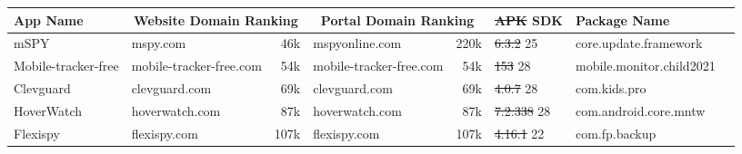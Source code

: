 \documentclass[sigconf,balance=false]{acmart}
\newcommand{\ltgrey}{\rowcolor[gray]{0.88}} %
\providecommand{\DIFadd}[1]{{\protect\color{blue}\uwave{#1}}} %
\providecommand{\DIFdel}[1]{{\protect\color{red}\sout{#1}}}                      %
\providecommand{\DIFaddFL}[1]{\DIFadd{#1}} %
\providecommand{\DIFdelFL}[1]{\DIFdel{#1}} %
\providecommand{\DIFaddbeginFL}{} %
\providecommand{\DIFaddendFL}{} %
\providecommand{\DIFdelbeginFL}{} %
\providecommand{\DIFdelendFL}{} %
\newcommand{\DIFscaledelfig}{0.5}
\newlength{\DIFdelgraphicswidth} %
\newlength{\DIFdelgraphicsheight} %
\newcommand{\DIFaddincludegraphics}[2][]{{\color{blue}\fbox{\DIFOincludegraphics[#1]{#2}}}} %
\newcommand{\DIFdelincludegraphics}[2][]{%
\sbox{\DIFdelgraphicsbox}{\DIFOincludegraphics[#1]{#2}}%
\settoboxwidth{\DIFdelgraphicswidth}{\DIFdelgraphicsbox} %
\settoboxtotalheight{\DIFdelgraphicsheight}{\DIFdelgraphicsbox} %
\scalebox{\DIFscaledelfig}{%
\parbox[b]{\DIFdelgraphicswidth}{\usebox{\DIFdelgraphicsbox}\\[-\baselineskip] \rule{\DIFdelgraphicswidth}{0em}}\llap{\resizebox{\DIFdelgraphicswidth}{\DIFdelgraphicsheight}{%
\setlength{\unitlength}{\DIFdelgraphicswidth}%
\begin{picture}(1,1)%
\thicklines\linethickness{2pt} %
{\color[rgb]{1,0,0}\put(0,0){\framebox(1,1){}}}%
{\color[rgb]{1,0,0}\put(0,0){\line( 1,1){1}}}%
{\color[rgb]{1,0,0}\put(0,1){\line(1,-1){1}}}%
\end{picture}%
}\hspace*{3pt}}} %
} %
\DeclareRobustCommand{\DIFaddbeginFL}{\DIFOaddbeginFL \let\includegraphics\DIFaddincludegraphics} %
\DeclareRobustCommand{\DIFaddendFL}{\DIFOaddendFL \let\includegraphics\DIFOincludegraphics} %
\DeclareRobustCommand{\DIFdelbeginFL}{\DIFOdelbeginFL \let\includegraphics\DIFdelincludegraphics} %
\DeclareRobustCommand{\DIFdelendFL}{\DIFOaddendFL \let\includegraphics\DIFOincludegraphics} %
\begin{document}
\begin{table*}[t]
  \begin{tabular}{@{}llrlrll@{\hskip 5pt}l}
    App Name             & \DIFdelbeginFL %
\DIFdelendFL \DIFaddbeginFL \multicolumn{2}{c}{Website Domain \hspace*{0.2in}\hfill\hspace*{0.1in} Ranking}  \DIFaddendFL & \DIFdelbeginFL %
\DIFdelendFL \DIFaddbeginFL \multicolumn{2}{c}{Portal Domain \hspace*{0.25in}\hfill\hspace*{0.1in} Ranking} \DIFaddendFL & \DIFdelbeginFL \DIFdelFL{APK }%
\DIFdelendFL \DIFaddbeginFL \DIFaddFL{Target }\DIFaddendFL SDK &Package Name                                    \\
    \midrule
    mSPY                 &mspy.com                 &46k             & mspyonline.com  &220k                          &\DIFdelbeginFL \DIFdelFL{6.3.2             }%
\DIFdelendFL 25               &core.update.framework                           \\
    Mobile-tracker-free  &mobile-tracker-free.com  &54k             &mobile-tracker-free.com  &54k                   &\DIFdelbeginFL \DIFdelFL{153               }%
\DIFdelendFL 28                      &mobile.monitor.child2021                        \\
    Clevguard            &clevguard.com            &69k             & clevguard.com  &69k                            &\DIFdelbeginFL \DIFdelFL{4.0.7             }%
\DIFdelendFL 28             &com.kids.pro                                    \\
    \ltgrey HoverWatch   &hoverwatch.com           &87k             &hoverwatch.com  &87k                            &\DIFdelbeginFL \DIFdelFL{7.2.338           }%
\DIFdelendFL 28          &com.android.core.mntw                           \\
    \ltgrey Flexispy     &flexispy.com             &107k            &flexispy.com &107k                              &\DIFdelbeginFL \DIFdelFL{4.16.1            }%
\DIFdelendFL 22          &com.fp.backup                                   \\

\end{tabular}
\end{table*}
\end{document}
